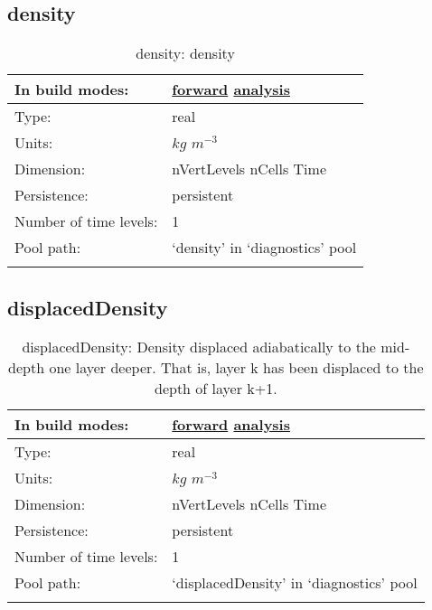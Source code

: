 \subsection[density]{density}
\label{subsec:var_sec_diagnostics_density}
\begin{center}
\begin{longtable}{| p{2.0in} | p{4.0in} |}
        \hline 
        In build modes: & \hyperref[subsec:forward_var_tab_diagnostics]{forward} \hyperref[subsec:analysis_var_tab_diagnostics]{analysis} \\
        \hline 
        Type: & real \\
        \hline 
        Units: & $kg$ $m^{-3}$ \\
        \hline 
        Dimension: & nVertLevels nCells Time \\
        \hline 
        Persistence: & persistent \\
        \hline 
        Number of time levels: & 1 \\
        \hline 
            Pool path: & `density' in `diagnostics' pool \\
		 \hline 
    \caption{density: density}
\end{longtable}
\end{center}
\subsection[displacedDensity]{displacedDensity}
\label{subsec:var_sec_diagnostics_displacedDensity}
\begin{center}
\begin{longtable}{| p{2.0in} | p{4.0in} |}
        \hline 
        In build modes: & \hyperref[subsec:forward_var_tab_diagnostics]{forward} \hyperref[subsec:analysis_var_tab_diagnostics]{analysis} \\
        \hline 
        Type: & real \\
        \hline 
        Units: & $kg$ $m^{-3}$ \\
        \hline 
        Dimension: & nVertLevels nCells Time \\
        \hline 
        Persistence: & persistent \\
        \hline 
        Number of time levels: & 1 \\
        \hline 
            Pool path: & `displacedDensity' in `diagnostics' pool \\
		 \hline 
    \caption{displacedDensity: Density displaced adiabatically to the mid-depth one layer deeper.  That is, layer k has been displaced to the depth of layer k+1.}
\end{longtable}
\end{center}
